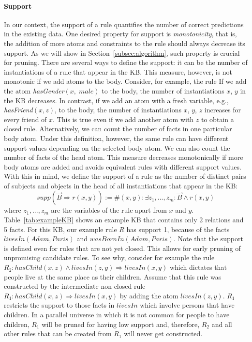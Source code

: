 \paragraph{Support} \label{support}In our context, the support of a rule quantifies the number of correct predictions in the existing data.
One desired property for support is \emph{monotonicity}, that is, the addition of more atoms and constraints to the rule should 
always decrease its support. As we will show in Section~\ref{subsec:algorithm}, such property is crucial for pruning.
There are several ways to define the support: it can be the number of instantiations of a rule that appear in the KB.
This measure, however, is not monotonic if we add atoms to the body. Consider, for example, the rule
If we add the atom \emph{hasGender}$(x,\;male)$ to the body, the number of instantiations $x$, $y$ in the KB decreases.
In contrast, if we add an atom with a fresh variable, e.g., \emph{hasFriend}$(x,z)$, to the body, 
the number of instantiations $x$, $y$, $z$ increases for every friend of $x$. This is true even 
if we add another atom with $z$ to obtain a closed rule.
Alternatively, we can count the number of facts in one particular body atom.
Under this definition, however, 
the same rule can have different support values depending on the selected body atom.
We can also count the number of facts of the head atom.
This measure decreases monotonically if more body atoms are added and avoids equivalent rules with different support values.
With this in mind, we define the support of a rule as the number of distinct pairs of subjects 
and objects in the head of all instantiations that appear in the KB:
\[supp(\vec{B} \Rightarrow r(x,y)) := \#(x,y): \exists z_1,...,z_m: \vec{B} \wedge r(x,y)\]
where $z_1,...,z_m$ are the variables of the rule apart from $x$ and $y$.
Table~\ref{tab:exampleKB} shows an example KB that contains only 2 relations and 5 facts. For this KB, 
our example rule $R$ has support 1, because of the facts $livesIn(Adam,Paris)$ and $wasBornIn(Adam,Paris)$.
Note that the support is defined even for rules that are not yet closed. This allows for early pruning of unpromising candidate rules.
To see why, consider for example the rule $R_2: hasChild(x,z) \wedge livesIn(z,y)\Rightarrow livesIn(x,y)$ which dictates that people live at the same place as their children.
Assume that this rule was constructed by the intermediate non-closed rule $R_1:hasChild(x,z) \Rightarrow livesIn(x,y)$  by adding the atom $livesIn(z,y)$.
$R_1$ restricts the support to those facts in $livesIn$ which involve persons that have children. 
In a parallel universe in which it is not common for people to have children, $R_1$ will be pruned for having low support and, therefore, $R_2$ and all other rules that can be 
created from $R_1$ will never get constructed.



